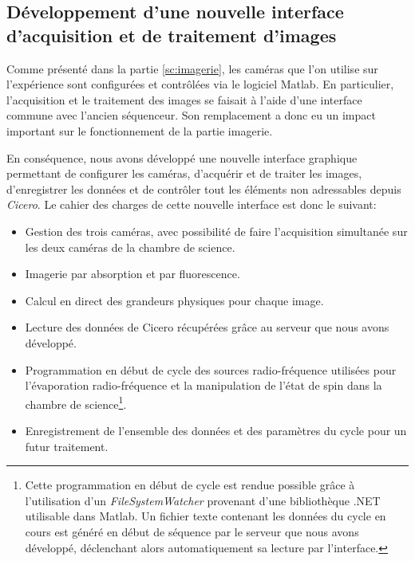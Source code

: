 \subsection{Développement d'une nouvelle interface d'acquisition et de traitement d'images}
Comme présenté dans la partie \ref{sc:imagerie}, les caméras que l'on utilise sur l'expérience sont configurées et contrôlées via le logiciel Matlab. En particulier, l'acquisition et le traitement des images se faisait à l'aide d'une interface commune avec l'ancien séquenceur. Son remplacement a donc eu un impact important sur le fonctionnement de la partie imagerie. 

En conséquence, nous avons développé une nouvelle interface graphique permettant de configurer les caméras, d'acquérir et de traiter les images, d'enregistrer les données et de contrôler tout les éléments non adressables depuis \emph{Cicero}. Le cahier des charges de cette nouvelle interface est donc le suivant:
\begin{itemize}
\item[\textendash] Gestion des trois caméras, avec possibilité de faire l'acquisition simultanée sur les deux caméras de la chambre de science.%
\item[\textendash] Imagerie par absorption et par fluorescence.
\item[\textendash] Calcul en direct des grandeurs physiques pour chaque image.
\item[\textendash] Lecture des données de Cicero récupérées grâce au serveur que nous avons développé.
\item[\textendash] Programmation en début de cycle des sources radio-fréquence utilisées pour l'évaporation radio-fréquence et la manipulation de l'état de spin dans la chambre de science\footnote{Cette programmation en début de cycle est rendue possible grâce à l'utilisation d'un \emph{FileSystemWatcher} provenant d'une bibliothèque .NET utilisable dans Matlab. Un fichier texte contenant les données du cycle en cours est généré en début de séquence par le serveur que nous avons développé, déclenchant alors automatiquement sa lecture par l'interface.}.
\item[\textendash] Enregistrement de l'ensemble des données et des paramètres du cycle pour un futur traitement.
\end{itemize}

